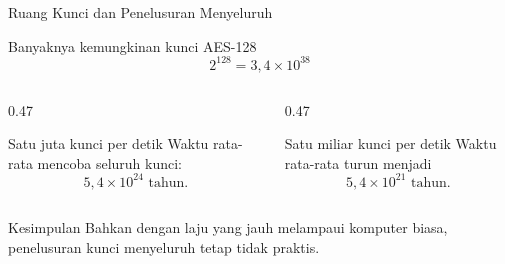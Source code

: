 \documentclass[aspectratio=169,11pt]{beamer}
\begin{document}
\begin{frame}{Ruang Kunci dan Penelusuran Menyeluruh}
    \begin{block}{Banyaknya kemungkinan kunci AES-128}
        \[
            2^{128} = 3{,}4 \times 10^{38}
        \]
    \end{block}
    \vspace{0.1cm}
    \begin{columns}[T,onlytextwidth]
        \begin{column}{0.47\textwidth}
            \begin{exampleblock}{Satu juta kunci per detik}
                \footnotesize
                Waktu rata-rata mencoba seluruh kunci:
                \[
                    5{,}4 \times 10^{24} \text{ tahun}.
                \]
            \end{exampleblock}
        \end{column}
        \begin{column}{0.47\textwidth}
            \begin{exampleblock}{Satu miliar kunci per detik}
                \footnotesize
                Waktu rata-rata turun menjadi
                \[
                    5{,}4 \times 10^{21} \text{ tahun}.
                \]
            \end{exampleblock}
        \end{column}
    \end{columns}
    \vspace{0.1cm}
    \begin{alertblock}{Kesimpulan}
        \footnotesize
        Bahkan dengan laju yang jauh melampaui komputer biasa, penelusuran
        kunci menyeluruh tetap tidak praktis.
    \end{alertblock}
\end{frame}
\end{document}
